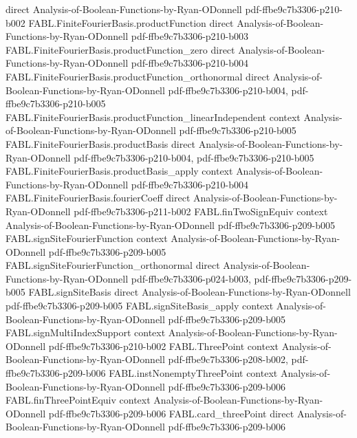 \begin{theorem}
  {direct}
  {Analysis-of-Boolean-Functions-by-Ryan-ODonnell}
  {pdf-ffbe9c7b3306-p210-b002}
\proofstep
  {FABL.FiniteFourierBasis.productFunction}
  {direct}
  {Analysis-of-Boolean-Functions-by-Ryan-ODonnell}
  {pdf-ffbe9c7b3306-p210-b003}
\proofstep
  {FABL.FiniteFourierBasis.productFunction_zero}
  {direct}
  {Analysis-of-Boolean-Functions-by-Ryan-ODonnell}
  {pdf-ffbe9c7b3306-p210-b004}
\proofstep
  {FABL.FiniteFourierBasis.productFunction_orthonormal}
  {direct}
  {Analysis-of-Boolean-Functions-by-Ryan-ODonnell}
  {pdf-ffbe9c7b3306-p210-b004,
    pdf-ffbe9c7b3306-p210-b005}
\proofstep
  {FABL.FiniteFourierBasis.productFunction_linearIndependent}
  {context}
  {Analysis-of-Boolean-Functions-by-Ryan-ODonnell}
  {pdf-ffbe9c7b3306-p210-b005}
\proofstep
  {FABL.FiniteFourierBasis.productBasis}
  {direct}
  {Analysis-of-Boolean-Functions-by-Ryan-ODonnell}
  {pdf-ffbe9c7b3306-p210-b004,
    pdf-ffbe9c7b3306-p210-b005}
\proofstep
  {FABL.FiniteFourierBasis.productBasis_apply}
  {context}
  {Analysis-of-Boolean-Functions-by-Ryan-ODonnell}
  {pdf-ffbe9c7b3306-p210-b004}
\proofstep
  {FABL.FiniteFourierBasis.fourierCoeff}
  {direct}
  {Analysis-of-Boolean-Functions-by-Ryan-ODonnell}
  {pdf-ffbe9c7b3306-p211-b002}
\proofstep
  {FABL.finTwoSignEquiv}
  {context}
  {Analysis-of-Boolean-Functions-by-Ryan-ODonnell}
  {pdf-ffbe9c7b3306-p209-b005}
\proofstep
  {FABL.signSiteFourierFunction}
  {context}
  {Analysis-of-Boolean-Functions-by-Ryan-ODonnell}
  {pdf-ffbe9c7b3306-p209-b005}
\proofstep
  {FABL.signSiteFourierFunction_orthonormal}
  {direct}
  {Analysis-of-Boolean-Functions-by-Ryan-ODonnell}
  {pdf-ffbe9c7b3306-p024-b003,
    pdf-ffbe9c7b3306-p209-b005}
\proofstep
  {FABL.signSiteBasis}
  {direct}
  {Analysis-of-Boolean-Functions-by-Ryan-ODonnell}
  {pdf-ffbe9c7b3306-p209-b005}
\proofstep
  {FABL.signSiteBasis_apply}
  {context}
  {Analysis-of-Boolean-Functions-by-Ryan-ODonnell}
  {pdf-ffbe9c7b3306-p209-b005}
\proofstep
  {FABL.signMultiIndexSupport}
  {context}
  {Analysis-of-Boolean-Functions-by-Ryan-ODonnell}
  {pdf-ffbe9c7b3306-p210-b002}
\proofstep
  {FABL.ThreePoint}
  {context}
  {Analysis-of-Boolean-Functions-by-Ryan-ODonnell}
  {pdf-ffbe9c7b3306-p208-b002,
    pdf-ffbe9c7b3306-p209-b006}
\proofstep
  {FABL.instNonemptyThreePoint}
  {context}
  {Analysis-of-Boolean-Functions-by-Ryan-ODonnell}
  {pdf-ffbe9c7b3306-p209-b006}
\proofstep
  {FABL.finThreePointEquiv}
  {context}
  {Analysis-of-Boolean-Functions-by-Ryan-ODonnell}
  {pdf-ffbe9c7b3306-p209-b006}
\proofstep
  {FABL.card_threePoint}
  {direct}
  {Analysis-of-Boolean-Functions-by-Ryan-ODonnell}
  {pdf-ffbe9c7b3306-p209-b006}

\end{theorem}
